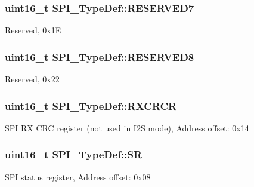 \subsubsection[{\texorpdfstring{R\+E\+S\+E\+R\+V\+E\+D7}{RESERVED7}}]{\setlength{\rightskip}{0pt plus 5cm}uint16\+\_\+t S\+P\+I\+\_\+\+Type\+Def\+::\+R\+E\+S\+E\+R\+V\+E\+D7}\hypertarget{struct_s_p_i___type_def_a98df0a538eb077b2cfc5194eda200f1b}{}\label{struct_s_p_i___type_def_a98df0a538eb077b2cfc5194eda200f1b}
Reserved, 0x1E 
\subsubsection[{\texorpdfstring{R\+E\+S\+E\+R\+V\+E\+D8}{RESERVED8}}]{\setlength{\rightskip}{0pt plus 5cm}uint16\+\_\+t S\+P\+I\+\_\+\+Type\+Def\+::\+R\+E\+S\+E\+R\+V\+E\+D8}\hypertarget{struct_s_p_i___type_def_a0ffe762827b71caff20c75bf105387f6}{}\label{struct_s_p_i___type_def_a0ffe762827b71caff20c75bf105387f6}
Reserved, 0x22 
\subsubsection[{\texorpdfstring{R\+X\+C\+R\+CR}{RXCRCR}}]{ uint16\+\_\+t S\+P\+I\+\_\+\+Type\+Def\+::\+R\+X\+C\+R\+CR}\hypertarget{struct_s_p_i___type_def_ab53da6fb851d911ae0b1166be2cfe48a}{}\label{struct_s_p_i___type_def_ab53da6fb851d911ae0b1166be2cfe48a}
S\+PI RX C\+RC register (not used in I2S mode), Address offset\+: 0x14 
\subsubsection[{\texorpdfstring{SR}{SR}}]{ uint16\+\_\+t S\+P\+I\+\_\+\+Type\+Def\+::\+SR}\hypertarget{struct_s_p_i___type_def_a017d7d54a7bf1925facea6b5e02fec83}{}\label{struct_s_p_i___type_def_a017d7d54a7bf1925facea6b5e02fec83}
S\+PI status register, Address offset\+: 0x08 
